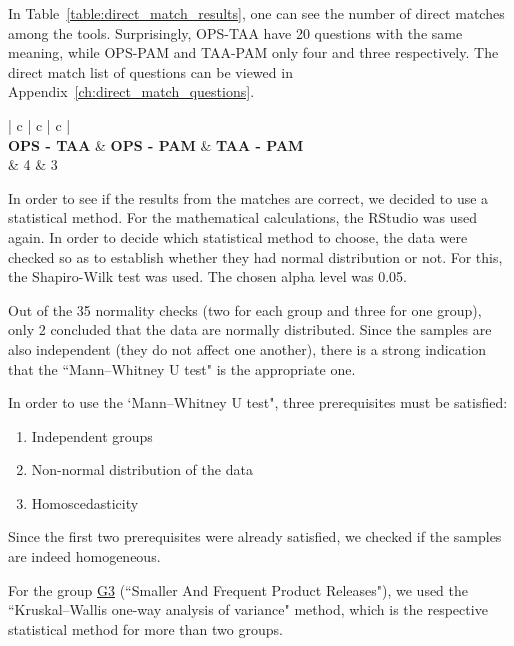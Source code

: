 In Table~\ref{table:direct_match_results}, one can see the number of direct matches among the tools. Surprisingly, \ac{OPS}-\ac{TAA} have 20 questions with the same meaning, while \ac{OPS}-\ac{PAM} and \ac{TAA}-\ac{PAM} only four and three respectively. The direct match list of questions can be viewed in Appendix~\ref{ch:direct_match_questions}. 

\begin{table} [H]
	\begin{tabular}{{| c | c | c |}}
		\hline
		  \\ \hline
		\textbf{OPS - TAA} & \textbf{OPS - PAM} & \textbf{TAA - PAM} \\  & 4 & 3 \\ \hline
	\end{tabular}
\caption{Direct Match Questions Among Tools - Results}
\label{table:direct_match_results}
\end{table} 

In order to see if the results from the matches are correct, we decided to use a statistical method. For the mathematical calculations, the RStudio\texttrademark \cite{rstudio} was used again. In order to decide which statistical method to choose, the data were checked so as to establish whether they had normal distribution or not. For this, the Shapiro-Wilk test was used. The chosen alpha level was 0.05.

Out of the 35 normality checks (two for each group and three for one group), only 2 concluded that the data are normally distributed. Since the samples are also independent (they do not affect one another), there is a strong indication that the ``Mann–Whitney U test" is the appropriate one.

In order to use the `Mann–Whitney U test", three prerequisites must be satisfied:

\begin{enumerate}
	\item Independent groups
	\item Non-normal distribution of the data
	\item Homoscedasticity 
\end{enumerate} 

Since the first two prerequisites were already satisfied, we checked if the samples are indeed homogeneous.

For the group \hyperref[G3]{G3} (``Smaller And Frequent Product Releases"), we used the ``Kruskal–Wallis one-way analysis of variance" method, which is the respective statistical method for more than two groups.

